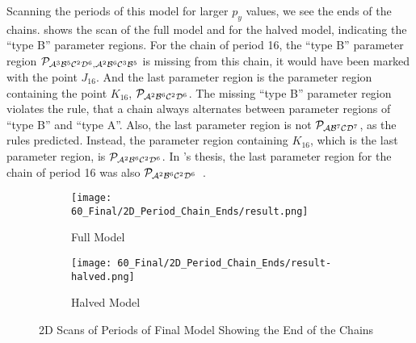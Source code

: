 Scanning the periods of this model for larger $p_y$ values, we see the ends of the chains.
 shows the scan of the full model and  for the halved model, indicating the ``type B'' parameter regions.
For the chain of period 16, the ``type B'' parameter region $\mathcal{P}_{\mathcal{A}^3\mathcal{B}^5\mathcal{C}^2\mathcal{D}^6, \mathcal{A}^2\mathcal{B}^6\mathcal{C}^3\mathcal{B}^5}$ is missing from this chain, it would have been marked with the point $J_{16}$.
And the last parameter region is the parameter region containing the point $K_{16}$, $\mathcal{P}_{\mathcal{A}^2\mathcal{B}^6\mathcal{C}^2\mathcal{D}^6}$.
The missing ``type B'' parameter region violates the rule, that a chain always alternates between parameter regions of ``type B'' and ``type A''.
Also, the last parameter region is not $\mathcal{P}_{\mathcal{A}\mathcal{B}^7\mathcal{C}\mathcal{D}^7}$, as the rules predicted.
Instead, the parameter region containing $K_{16}$, which is the last parameter region, is $\mathcal{P}_{\mathcal{A}^2\mathcal{B}^6\mathcal{C}^2\mathcal{D}^6}$.
In 's thesis, the last parameter region for the chain of period 16 was also $\mathcal{P}_{\mathcal{A}^2\mathcal{B}^6\mathcal{C}^2\mathcal{D}^6}$~\Cite{akyuz2022}.

\begin{figure}
    \centering
    \begin{subfigure}{0.4\textwidth}
        \centering
        \texttt{[image: 60\_Final/2D\_Period\_Chain\_Ends/result.png]}
        \caption{Full Model}
        \label{fig:final.period.whole.full}
    \end{subfigure}
    \begin{subfigure}{0.4\textwidth}
        \centering
        \texttt{[image: 60\_Final/2D\_Period\_Chain\_Ends/result-halved.png]}
        \caption{Halved Model}
        \label{fig:final.period.whole.halved}
    \end{subfigure}
    \caption{2D Scans of Periods of Final Model Showing the End of the Chains}
\end{figure}
